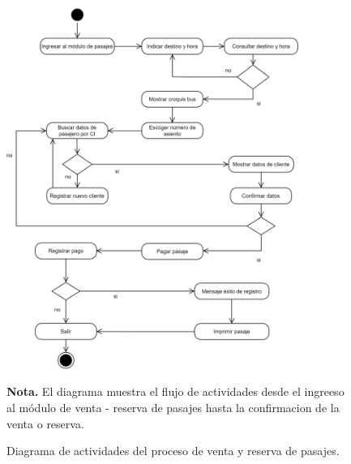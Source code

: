 	\begin{figure}[!h] %
		\caption[Diagrama de actividades - Venta y reserva de pasajes]
		{\newline Diagrama de actividades del proceso de venta y reserva de pasajes.} %
		\centering
		\includegraphics[width=0.85\textwidth]{imagenes/cap_3/pasaje.drawio.png} %
		\begin{flushleft}
		\begin{doublespace}
			\hspace{1.20cm} \textbf{Nota.} El diagrama muestra el flujo de actividades desde el ingreeso al módulo de venta - reserva de pasajes hasta la confirmacion de la venta o reserva. %
		\end{doublespace}
		\end{flushleft}
		\vspace{-16pt}
		\label{fig:DA_pasajes} %
	\end{figure}
	
	\vspace{0.3cm} %
	
